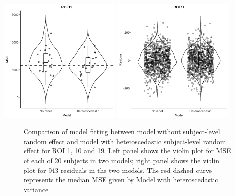 \includegraphics[width=0.45\textwidth]{ROI19_voilin_nohomo.png}
\includegraphics[width=0.45\textwidth]{ROI19_voilin_resi_nohomo.png}

\begin{figure}[h!]
\centering
\caption{Comparison of model fitting between model without subject-level random effect and model with heteroscedastic subject-level random effect for ROI 1, 10 and 19.  Left panel shows the violin plot for MSE of each of 20 subjects in two models; right panel shows the violin plot for 943 residuals in the two models. The red dashed curve represents the median MSE given by Model with heteroscedastic variance}
\label{MSE_voilin}
\end{figure}





